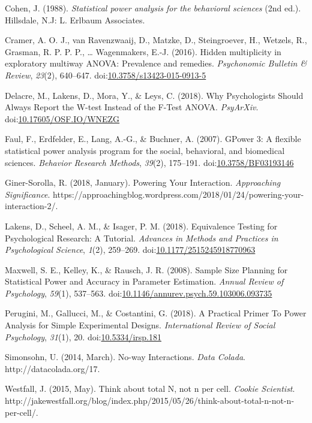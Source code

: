 \documentclass[,jou,floatsintext]{apa6}
\begin{document}
\leavevmode\hypertarget{ref-cohen_statistical_1988}{}%
Cohen, J. (1988). \emph{Statistical power analysis for the behavioral sciences} (2nd ed.). Hillsdale, N.J: L. Erlbaum Associates.

\leavevmode\hypertarget{ref-cramer_hidden_2016}{}%
Cramer, A. O. J., van Ravenzwaaij, D., Matzke, D., Steingroever, H., Wetzels, R., Grasman, R. P. P. P., \ldots{} Wagenmakers, E.-J. (2016). Hidden multiplicity in exploratory multiway ANOVA: Prevalence and remedies. \emph{Psychonomic Bulletin \& Review}, \emph{23}(2), 640--647. doi:\href{https://doi.org/10.3758/s13423-015-0913-5}{10.3758/s13423-015-0913-5}

\leavevmode\hypertarget{ref-delacre_why_2018}{}%
Delacre, M., Lakens, D., Mora, Y., \& Leys, C. (2018). Why Psychologists Should Always Report the W-test Instead of the F-Test ANOVA. \emph{PsyArXiv}. doi:\href{https://doi.org/10.17605/OSF.IO/WNEZG}{10.17605/OSF.IO/WNEZG}

\leavevmode\hypertarget{ref-faul_gpower_2007}{}%
Faul, F., Erdfelder, E., Lang, A.-G., \& Buchner, A. (2007). GPower 3: A flexible statistical power analysis program for the social, behavioral, and biomedical sciences. \emph{Behavior Research Methods}, \emph{39}(2), 175--191. doi:\href{https://doi.org/10.3758/BF03193146}{10.3758/BF03193146}

\leavevmode\hypertarget{ref-giner-sorolla_powering_2018}{}%
Giner-Sorolla, R. (2018, January). Powering Your Interaction. \emph{Approaching Significance}. https://approachingblog.wordpress.com/2018/01/24/powering-your-interaction-2/.

\leavevmode\hypertarget{ref-lakens_equivalence_2018}{}%
Lakens, D., Scheel, A. M., \& Isager, P. M. (2018). Equivalence Testing for Psychological Research: A Tutorial. \emph{Advances in Methods and Practices in Psychological Science}, \emph{1}(2), 259--269. doi:\href{https://doi.org/10.1177/2515245918770963}{10.1177/2515245918770963}

\leavevmode\hypertarget{ref-maxwell_sample_2008}{}%
Maxwell, S. E., Kelley, K., \& Rausch, J. R. (2008). Sample Size Planning for Statistical Power and Accuracy in Parameter Estimation. \emph{Annual Review of Psychology}, \emph{59}(1), 537--563. doi:\href{https://doi.org/10.1146/annurev.psych.59.103006.093735}{10.1146/annurev.psych.59.103006.093735}

\leavevmode\hypertarget{ref-perugini_practical_2018}{}%
Perugini, M., Gallucci, M., \& Costantini, G. (2018). A Practical Primer To Power Analysis for Simple Experimental Designs. \emph{International Review of Social Psychology}, \emph{31}(1), 20. doi:\href{https://doi.org/10.5334/irsp.181}{10.5334/irsp.181}

\leavevmode\hypertarget{ref-simonsohn_no-way_2014}{}%
Simonsohn, U. (2014, March). No-way Interactions. \emph{Data Colada}. http://datacolada.org/17.

\leavevmode\hypertarget{ref-westfall_think_2015}{}%
Westfall, J. (2015, May). Think about total N, not n per cell. \emph{Cookie Scientist}. http://jakewestfall.org/blog/index.php/2015/05/26/think-about-total-n-not-n-per-cell/.
\end{document}
